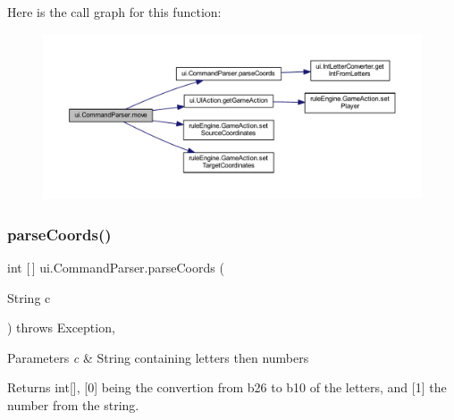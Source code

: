 Here is the call graph for this function\+:
\nopagebreak
\begin{figure}[H]
\begin{center}
\leavevmode
\includegraphics[width=350pt]{classui_1_1_command_parser_a93c89e96a15062847ba74d20d21075e1_cgraph}
\end{center}
\end{figure}
\mbox{\label{classui_1_1_command_parser_a6fe407cb1b5f88c583f4797de79fd98f}} 
\subsubsection{\texorpdfstring{parse\+Coords()}{parseCoords()}}
{\footnotesize\ttfamily int \mbox{[}$\,$\mbox{]} ui.\+Command\+Parser.\+parse\+Coords (\begin{DoxyParamCaption}\item[{String}]{c }\end{DoxyParamCaption}) throws Exception\hspace{0.3cm}{\ttfamily [inline]}, {\ttfamily [private]}}


\begin{DoxyParams}{Parameters}
{\em c} & String containing letters then numbers \\
\hline
\end{DoxyParams}
\begin{DoxyReturn}{Returns}
int\mbox{[}\mbox{]}, \mbox{[}0\mbox{]} being the convertion from b26 to b10 of the letters, and \mbox{[}1\mbox{]} the number from the string. 
\end{DoxyReturn}

